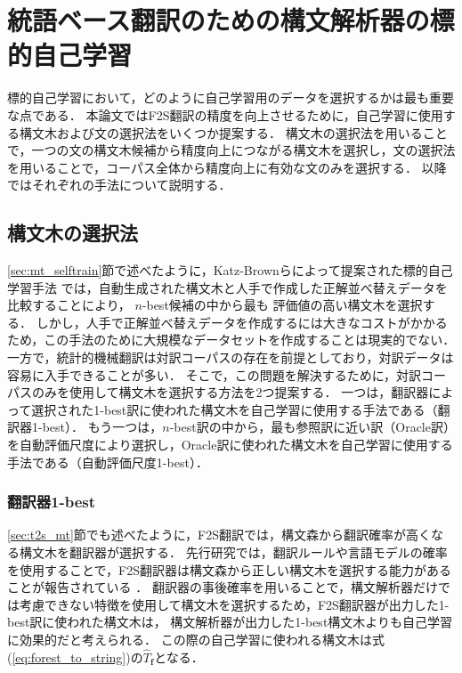 \documentclass[japanese]{jnlp_1.4}
\begin{document}
\section{統語ベース翻訳のための構文解析器の標的自己学習}
\label{sec:proposed_method}

標的自己学習において，どのように自己学習用のデータを選択するかは最も重要な点である．
本論文ではF2S翻訳の精度を向上させるために，自己学習に使用する構文木および文の選択法をいくつか提案する．
構文木の選択法を用いることで，一つの文の構文木候補から精度向上につながる構文木を選択し，文の選択法を用いることで，コーパス全体から精度向上に有効な文のみを選択する．
以降ではそれぞれの手法について説明する．


\subsection{構文木の選択法}
\label{sec:tree_selection}

\ref{sec:mt_selftrain}節で述べたように，Katz-Brownらによって提案された標的自己学習手法 \cite{katzbrown11targetedselftraining} では，自動生成された構文木と人手で作成した正解並べ替えデータを比較することにより，
$n$-best候補の中から最も
評価値の高い構文木を選択する．
しかし，人手で正解並べ替えデータを作成するには大きなコストがかかるため，この手法のために大規模なデータセットを作成することは現実的でない．
一方で，統計的機械翻訳は対訳コーパスの存在を前提としており，対訳データは容易に入手できることが多い．
そこで，この問題を解決するために，対訳コーパスのみを使用して構文木を選択する方法を2つ提案する．
一つは，翻訳器によって選択された1-best訳に使われた構文木を自己学習に使用する手法である（翻訳器1-best）．
もう一つは，$n$-best訳の中から，最も参照訳に近い訳（Oracle訳）を自動評価尺度により選択し，Oracle訳に使われた構文木を自己学習に使用する手法である（自動評価尺度1-best）．


\subsubsection{翻訳器1-best}
\label{sec:mt_1best}

\ref{sec:t2s_mt}節でも述べたように，F2S翻訳では，構文森から翻訳確率が高くなる構文木を翻訳器が選択する．
先行研究では，翻訳ルールや言語モデルの確率を使用することで，F2S翻訳器は構文森から正しい構文木を選択する能力があることが報告されている \cite{zhang12helporhurt}．
翻訳器の事後確率を用いることで，構文解析器だけでは考慮できない特徴を使用して構文木を選択するため，F2S翻訳器が出力した1-best訳に使われた構文木は，
構文解析器が出力した1-best構文木よりも自己学習に効果的だと考えられる．
この際の自己学習に使われる構文木は式(\ref{eq:forest_to_string})の$\hat{T}_{\bm{f}}$となる．
\end{document}
